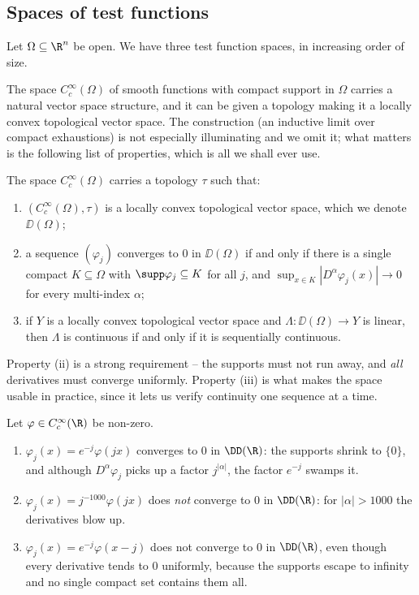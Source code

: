 \subsection{Spaces of test functions}

Let $\Omega \subseteq \R^n$ be open. We have three test function spaces, in increasing order of size.

The space $C_c^\infty(\Omega)$ of smooth functions with compact support in $\Omega$ carries a natural vector space structure, and it can be given a topology making it a locally convex topological vector space. The construction (an inductive limit over compact exhaustions) is not especially illuminating and we omit it; what matters is the following list of properties, which is all we shall ever use.

\begin{theorem}\label{thm:Dtopology}
	The space $C_c^\infty(\Omega)$ carries a topology $\tau$ such that:
	\begin{enumerate}[label=(\roman*)]
		\item $(C_c^\infty(\Omega),\tau)$ is a locally convex topological vector space, which we denote $\DD(\Omega)$;
		\item a sequence $(\varphi_j)$ converges to $0$ in $\DD(\Omega)$ if and only if there is a single compact $K \subseteq \Omega$ with $\supp \varphi_j \subseteq K$ for all $j$, and $\sup_{x\in K}|D^\alpha \varphi_j(x)|\to 0$ for every multi-index $\alpha$;
		\item if $Y$ is a locally convex topological vector space and $\Lambda : \DD(\Omega)\to Y$ is linear, then $\Lambda$ is continuous if and only if it is sequentially continuous.
	\end{enumerate}
\end{theorem}

Property (ii) is a strong requirement -- the supports must not run away, and \emph{all} derivatives must converge uniformly. Property (iii) is what makes the space usable in practice, since it lets us verify continuity one sequence at a time.

\begin{example}
	Let $\varphi \in C_c^\infty(\R)$ be non-zero.
	\begin{enumerate}[label=(\alph*)]
		\item $\varphi_j(x) = e^{-j}\varphi(jx)$ converges to $0$ in $\DD(\R)$: the supports shrink to $\{0\}$, and although $D^\alpha\varphi_j$ picks up a factor $j^{|\alpha|}$, the factor $e^{-j}$ swamps it.
		\item $\varphi_j(x) = j^{-1000}\varphi(jx)$ does \emph{not} converge to $0$ in $\DD(\R)$: for $|\alpha|>1000$ the derivatives blow up.
		\item $\varphi_j(x) = e^{-j}\varphi(x-j)$ does not converge to $0$ in $\DD(\R)$, even though every derivative tends to $0$ uniformly, because the supports escape to infinity and no single compact set contains them all.
	\end{enumerate}
\end{example}

